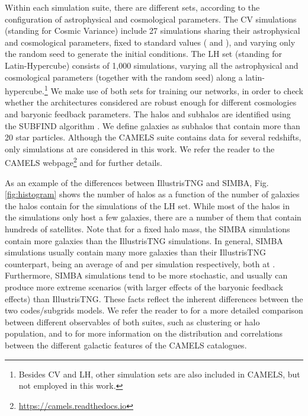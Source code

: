 \documentclass[twocolumn]{aastex631}
\begin{document}
Within each simulation suite, there are different sets, according to the configuration of astrophysical and cosmological parameters. The CV simulations (standing for Cosmic Variance) include 27 simulations sharing their astrophysical and cosmological parameters, fixed to standard values ( and ), and varying only the random seed to generate the initial conditions. The LH set (standing for Latin-Hypercube) consists of 1,000 simulations, varying all the astrophysical and cosmological parameters (together with the random seed) along a latin-hypercube.\footnote{Besides CV and LH, other simulation sets are also included in CAMELS, but not employed in this work.} We make use of both sets for training our networks, in order to check whether the architectures considered are robust enough for different cosmologies and baryonic feedback parameters. The halos and subhalos are identified using the \textsc{SUBFIND} algorithm \citep{Subfind}. We define galaxies as subhalos that contain more than 20 star particles. Although the CAMELS suite contains data for several redshifts, only simulations at  are considered in this work. We refer the reader to the CAMELS webpage\footnote{\url{https://camels.readthedocs.io}} and \cite{villaescusanavarro2020camels} for further details.

As an example of the differences between IllustrisTNG and SIMBA, Fig. \ref{fig:histogram} shows the number of halos as a function of the number of galaxies the halos contain for the simulations of the LH set. While most of the halos in the simulations only host a few galaxies, there are a number of them that contain hundreds of satellites. Note that for a fixed halo mass, the SIMBA simulations contain more galaxies than the IllustrisTNG simulations. In general, SIMBA simulations usually contain many more galaxies than their IllustrisTNG counterpart, being an average of  and  per simulation respectively, both at . Furthermore, SIMBA simulations tend to be more stochastic, and usually can produce more extreme scenarios (with larger effects of the baryonic feedback effects) than IllustrisTNG. These facts reflect the inherent differences between the two codes/subgrids models. We refer the reader to \cite{villaescusanavarro2020camels} for a more detailed comparison between different observables of both suites, such as clustering or halo population, and to \cite{2022arXiv220101300V, 2022arXiv220413713V} for more information on the distribution and correlations between the different galactic features of the CAMELS catalogues.
\end{document}
